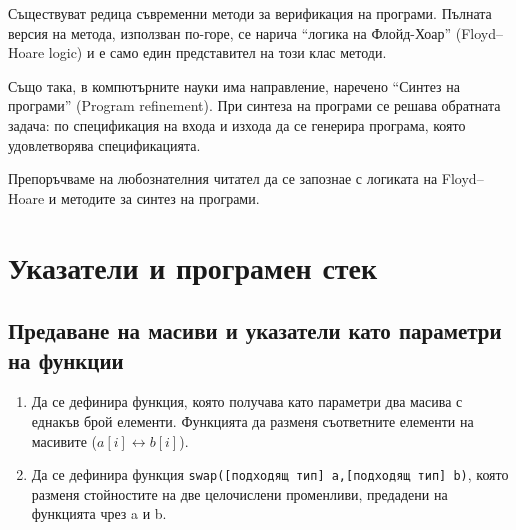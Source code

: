 {\begin{enumerate}[resume]
\end{enumerate}

\begin{mdframed}[hidealllines=true,backgroundcolor=gray!20]
Съществуват редица съвременни методи за верификация на програми. Пълната версия на метода, използван по-горе, се нарича ``логика на Флойд-Хоар'' (Floyd–Hoare logic) и е само един представител на този клас методи.

Също така, в компютърните науки има направление, наречено ``Синтез на програми'' (Program refinement). При синтеза на програми се решава обратната задача: по спецификация на входа и изхода да се генерира програма, която удовлетворява спецификацията.

Препоръчваме на любознателния читател да се запознае с логиката на Floyd–Hoare и методите за синтез на програми.
\end{mdframed}

\pagebreak

\clearpage\section{Указатели и програмен стек}

\subsection {Предаване на масиви и указатели като параметри на функции}
\begin{enumerate}
  \item Да се дефинира функция, която получава като параметри два масива с еднакъв брой елементи. Функцията да разменя съответните елементи на масивите ($a[i] \leftrightarrow b[i]$).
  \item Да се дефинира функция \texttt{swap([подходящ тип] a,[подходящ тип] b)}, която разменя стойностите на две целочислени променливи, предадени на функцията чрез a и b.
\end{enumerate}

}
